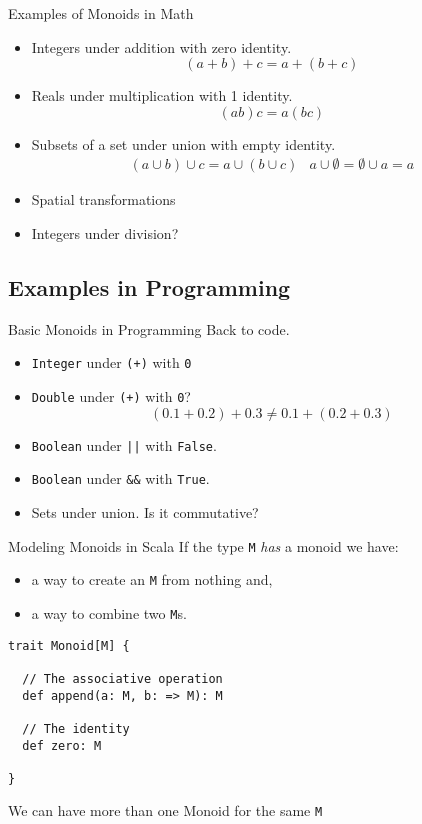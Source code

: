\documentclass{beamer}
\begin{document}
\begin{frame}{Examples of Monoids in Math}
  \begin{itemize}
    \item Integers under addition with zero identity.
      \[(a + b) + c = a + (b + c)\]
    \item Reals under multiplication with 1 identity.
      \[(a b) c = a (b c)\]
    \item Subsets of a set under union with empty identity.
      \begin{eqnarray*}
      (a \cup b)\cup  c = a\cup  (b\cup  c) & a \cup \emptyset =
        \emptyset \cup a = a
      \end{eqnarray*}
    \item Spatial transformations
    \item Integers under division?
  \end{itemize}
\end{frame}

\subsection{Examples in Programming}

\begin{frame}{Basic Monoids in Programming}
  Back to code.

  \begin{itemize}
    \item \texttt{Integer} under \texttt{(+)} with \texttt{0}
    \item \texttt{Double} under \texttt{(+)} with \texttt{0}?
      \pause
      \[ (0.1+0.2)+0.3 \neq 0.1+(0.2+0.3)\]
      \pause
    \item \texttt{Boolean} under \texttt{||} with \texttt{False}.
    \item \texttt{Boolean} under \texttt{\&\&} with \texttt{True}.
    \item Sets under union. Is it commutative?
  \end{itemize}
\end{frame}

\begin{frame}[fragile]{Modeling Monoids in Scala}
  If the type \texttt{M} \emph{has} a monoid we have:
  \begin{itemize}
    \item a way to create an \texttt{M} from nothing and,
    \item a way to combine two \texttt{M}s.
  \end{itemize}

  \begin{block}{}
  \begin{lstlisting}
trait Monoid[M] {

  // The associative operation
  def append(a: M, b: => M): M

  // The identity
  def zero: M

}
  \end{lstlisting}
  \end{block}

  We can have more than one Monoid for the same \texttt{M}
\end{frame}
\end{document}
